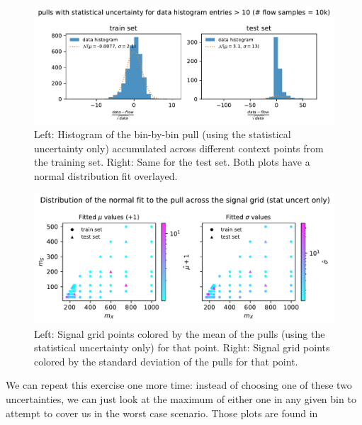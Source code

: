 \documentclass[
  11pt,
  numbers=noendperiod]{book}
\begin{document}
\begin{figure}

{\centering \includegraphics{./images/sh/sh-pulls-stats.pdf}

}

\caption{\label{fig-pulls-sh-stats}Left: Histogram of the bin-by-bin
pull (using the statistical uncertainty only) accumulated across
different context points from the training set. Right: Same for the test
set. Both plots have a normal distribution fit overlayed.}

\end{figure}

\begin{figure}

{\centering \includegraphics{./images/sh/pull-dist-stats.pdf}

}

\caption{\label{fig-pull-dist-stats}Left: Signal grid points colored by
the mean of the pulls (using the statistical uncertainty only) for that
point. Right: Signal grid points colored by the standard deviation of
the pulls for that point.}

\end{figure}

We can repeat this exercise one more time: instead of choosing one of
these two uncertainties, we can just look at the maximum of either one
in any given bin to attempt to cover us in the worst case scenario.
Those plots are found in
\end{document}
